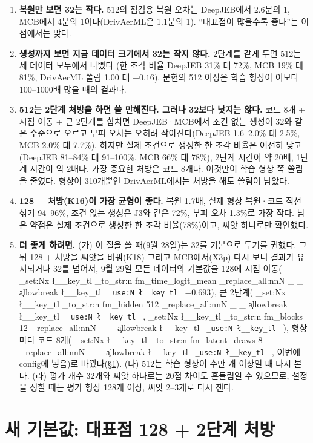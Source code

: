 \documentclass[11pt]{article}
\DeclareRobustCommand{\key}[1]{
  \tl_set:Nx \l__key_tl { \tl_to_str:n {#1} }
  \regex_replace_all:nnN { \_ } { \cO\_ \c{allowbreak} } \l__key_tl
  \texttt{ \tl_use:N \l__key_tl }
}
\begin{document}
\begin{enumerate}
\item \textbf{복원만 보면 32는 작다.} 512의 점검용 복원 오차는 DeepJEB에서 2.6분의 1, MCB에서 4분의 1이다(DrivAerML은 1.1분의 1). ``대표점이 많을수록 좋다''는 이 점에서는 맞다.
\item \textbf{생성까지 보면 지금 데이터 크기에서 32는 작지 않다.} 2단계를 같게 두면 512는 세 데이터 모두에서 나빴다
(한 조각 비율 DeepJEB 31\% 대 72\%, MCB 19\% 대 81\%, DrivAerML 쏠림 1.00 대 $-0.16$). 문헌의 512 이상은 학습 형상이 이보다 100--1000배 많을 때의 결과다.
\item \textbf{512는 2단계 처방을 하면 쓸 만해진다. 그러나 32보다 낫지는 않다.} 코드 8개 + 시점 이동 + 큰 2단계를 합치면 DeepJEB·MCB에서 조건 없는 생성이 32와 같은 수준으로 오르고
부피 오차는 오히려 작아진다(DeepJEB 1.6--2.0\% 대 2.5\%, MCB 2.0\% 대 7.7\%). 하지만 실제 조건으로 생성한 한 조각 비율은 여전히 낮고(DeepJEB 81--84\% 대 91--100\%, MCB 66\% 대 78\%),
2단계 시간이 약 20배, 1단계 시간이 약 2배다. 가장 중요한 처방은 코드 8개다. 이것만이 학습 형상 쪽 쏠림을 줄였다.
형상이 310개뿐인 DrivAerML에서는 처방을 해도 쏠림이 남았다.
\item \textbf{128 + 처방(K16)이 가장 균형이 좋다.} 복원 1.7배, 실제 형상 복원·코드 직선 섞기 94--96\%, 조건 없는 생성은 J3와 같은 72\%, 부피 오차 1.3\%로 가장 작다.
남은 약점은 실제 조건으로 생성한 한 조각 비율(78\%)이고, 씨앗 하나로만 확인했다.
\item \textbf{더 좋게 하려면.} (가) 이 절을 쓸 때(9월 28일)는 32를 기본으로 두기를 권했다. 그 뒤 128 + 처방을 씨앗을 바꿔(K18) 그리고 MCB에서(X3p) 다시 보니
결과가 유지되거나 32를 넘어서, 9월 29일 모든 데이터의 기본값을 128에 시점 이동(\key{fm_time_logit_mean} $-0.693$), 큰 2단계(\key{fm_hidden 512}, \key{fm_blocks 12}),
형상마다 코드 8개(\key{fm_latent_draws 8}, 이번에 config에 넣음)로 바꿨다(\S\ref{sec:default}). (다) 512는 학습 형상이 수만 개 이상일 때 다시 본다.
(라) 평가 개수 32개와 씨앗 하나로는 20점 차이도 흔들림일 수 있으므로, 설정을 정할 때는 평가 형상 128개 이상, 씨앗 2--3개로 다시 잰다.
\end{enumerate}

\section{새 기본값: 대표점 128 + 2단계 처방}
\label{sec:default}
\end{document}
